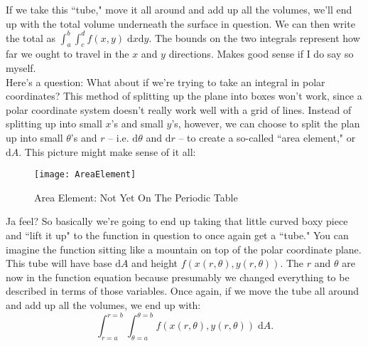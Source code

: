 \documentclass[11pt,titlepage]{article}
\begin{document}
If we take this ``tube," move it all around and add up all the volumes, we'll end up with the total volume underneath the surface in question. We can then write the total as $\int_a^b \int_c^d f(x,y)\;\text{d}x\text{d}y$. The bounds on the two integrals represent how far we ought to travel in the $x$ and $y$ directions. Makes good sense if I do say so myself. \\

Here's a question: What about if we're trying to take an integral in polar coordinates? This method of splitting up the plane into boxes won't work, since a polar coordinate system doesn't really work well with a grid of lines. Instead of splitting up into small $x$'s and small $y$'s, however, we can choose to split the plan up into small $\theta$'s and $r$ -- i.e. $\text{d}\theta$ and $\text{d}r$ -- to create a so-called ``area element," or $\text{d}A$. This picture might make sense of it all:

\begin{figure}[h]
\centering
\texttt{[image: AreaElement]}
\caption{Area Element: Not Yet On The Periodic Table}
\end{figure}

Ja feel? So basically we're going to end up taking that little curved boxy piece and ``lift it up" to the function in question to once again get a ``tube." You can imagine the function sitting like a mountain on top of the polar coordinate plane. This tube will have base $\text{d}A$ and height $f(x(r,\theta),y(r, \theta))$. The $r$ and $\theta$ are now in the function equation because presumably we changed everything to be described in terms of those variables. Once again, if we move the tube all around and add up all the volumes, we end up with: $$\int_{r=a}^{r=b} \int_{\theta = a}^{\theta=b} f(x(r,\theta),y(r, \theta))\;\text{d}A.$$ 
\end{document}

